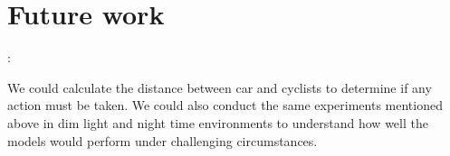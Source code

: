 \documentclass[11pt]{article}\usepackage[]{graphicx}\usepackage[]{color}
\begin{document}
\printbibliography

\section{Future work}:

We could calculate the distance between car and cyclists to determine if any action must be taken. We could also conduct the same experiments mentioned above in dim light and night time environments to understand how well the models would perform under challenging circumstances.\\
\end{document}
